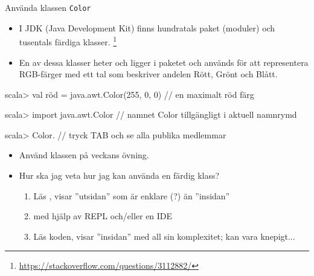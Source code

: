 \begin{Slide}{Använda klassen \texttt{Color}}\SlideFontSmall
\begin{itemize}
\item I JDK (Java Development Kit) finns hundratals paket (moduler) och tusentals färdiga klasser.
\footnote{\SlideFontTiny\url{https://stackoverflow.com/questions/3112882/}}

\item En av dessa klasser heter  och ligger i paketet  och används för att representera RGB-färger med ett tal som beskriver andelen Rött, Grönt och Blått.
\end{itemize}
\begin{REPL}
scala> val röd = java.awt.Color(255, 0, 0)    //  en maximalt röd färg

scala> import java.awt.Color  // namnet Color tillgängligt i aktuell namnrymd

scala> Color.    // tryck TAB och se alla publika medlemmar
\end{REPL}
\pause
\begin{itemize}
\item Använd klassen  på veckans övning.
\item Hur ska jag veta hur jag kan använda en färdig klass?
\pause
\begin{enumerate}\SlideFontTiny
  \item Läs , visar ''utsidan'' som är enklare (?) än ''insidan''
  \item {} med hjälp av REPL och/eller en IDE
  \item Läs koden, visar ''insidan'' med all sin komplexitet; kan vara knepigt...
\end{enumerate}
\end{itemize}

\end{Slide}



